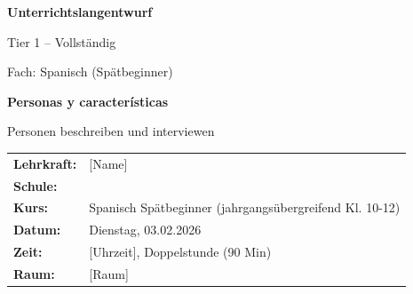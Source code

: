 \documentclass[11pt, a4paper]{article}
\begin{document}

\thispagestyle{empty}

\begin{center}
    \vspace*{1cm}

    {\Large\bfseries Unterrichtslangentwurf}

    \vspace{0.3cm}

    {\large Tier 1 -- Vollständig}

    \vspace{0.5cm}

    {\large Fach: Spanisch (Spätbeginner)}

    \vspace{1.5cm}

    {\LARGE\bfseries\color{spanisch} Personas y características}

    \vspace{0.3cm}

    {\large Personen beschreiben und interviewen}

    \vspace{0.5cm}


    \vspace{1.5cm}

    \begin{tabular}{ll}
        \textbf{Lehrkraft:} & [Name] \\[6pt]
        \textbf{Schule:} &  \\[6pt]
        \textbf{Kurs:} & Spanisch Spätbeginner (jahrgangsübergreifend Kl. 10-12) \\[6pt]
        \textbf{Datum:} & Dienstag, 03.02.2026 \\[6pt]
        \textbf{Zeit:} & [Uhrzeit], Doppelstunde (90 Min) \\[6pt]
        \textbf{Raum:} & [Raum] \\[6pt]
    \end{tabular}


\end{center}
\end{document}
